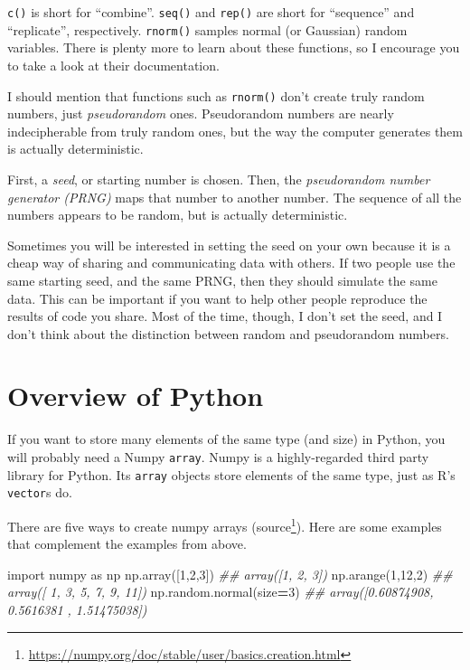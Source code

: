 \documentclass[
  12pt,
  krantz2]{krantz}
\makeatletter
\newenvironment{Shaded}{\begin{snugshade}}{\end{snugshade}}
\newcommand{\CommentTok}[1]{\textcolor[rgb]{0.37,0.37,0.37}{\textit{#1}}}
\newcommand{\DecValTok}[1]{\textcolor[rgb]{0.06,0.06,0.06}{#1}}
\newcommand{\ImportTok}[1]{#1}
\newcommand{\NormalTok}[1]{#1}
\newcommand{\OperatorTok}[1]{\textcolor[rgb]{0.43,0.43,0.43}{\textbf{#1}}}
\renewcommand{\href}[2]{#2\footnote{\url{#1}}}
\newenvironment{kframe}{%
\medskip{}
\setlength{\fboxsep}{.8em}
 \def\at@end@of@kframe{}%
 \ifinner\ifhmode%
  \def\at@end@of@kframe{\end{minipage}}%
  \begin{minipage}{\columnwidth}%
 \fi\fi%
 \def\FrameCommand##1{\hskip\@totalleftmargin \hskip-\fboxsep
 \colorbox{shadecolor}{##1}\hskip-\fboxsep
     \hskip-\linewidth \hskip-\@totalleftmargin \hskip\columnwidth}%
 \MakeFramed {\advance\hsize-\width
   \@totalleftmargin\z@ \linewidth\hsize
   \@setminipage}}%
 {\par\unskip\endMakeFramed%
 \at@end@of@kframe}
\renewenvironment{Shaded}{\begin{kframe}}{\end{kframe}}
\makeatother
\begin{document}
\texttt{c()} is short for ``combine''. \texttt{seq()} and \texttt{rep()} are short for ``sequence'' and ``replicate'', respectively. \texttt{rnorm()} samples normal (or Gaussian) random variables. There is plenty more to learn about these functions, so I encourage you to take a look at their documentation.

\begin{rmd-details}
I should mention that functions such as \texttt{rnorm()} don't create truly random numbers, just \emph{pseudorandom} ones. Pseudorandom numbers are nearly indecipherable from truly random ones, but the way the computer generates them is actually deterministic.

First, a \emph{seed}, or starting number is chosen. Then, the \emph{pseudorandom number generator (PRNG)} maps that number to another number. The sequence of all the numbers appears to be random, but is actually deterministic.

Sometimes you will be interested in setting the seed on your own because it is a cheap way of sharing and communicating data with others. If two people use the same starting seed, and the same PRNG, then they should simulate the same data. This can be important if you want to help other people reproduce the results of code you share. Most of the time, though, I don't set the seed, and I don't think about the distinction between random and pseudorandom numbers.

\end{rmd-details}

\hypertarget{overview-of-python}{%
\section{Overview of Python}\label{overview-of-python}}

If you want to store many elements of the same type (and size) in Python, you will probably need a Numpy \texttt{array}. Numpy is a highly-regarded third party library \citep{harris2020array} for Python. Its \texttt{array} objects store elements of the same type, just as R's \texttt{vector}s do.

There are five ways to create numpy arrays (\href{https://numpy.org/doc/stable/user/basics.creation.html}{source}). Here are some examples that complement the examples from above.

\begin{Shaded}
\begin{Highlighting}[]
\ImportTok{import}\NormalTok{ numpy }\ImportTok{as}\NormalTok{ np   }
\NormalTok{np.array([}\DecValTok{1}\NormalTok{,}\DecValTok{2}\NormalTok{,}\DecValTok{3}\NormalTok{])}
\CommentTok{\#\# array([1, 2, 3])}
\NormalTok{np.arange(}\DecValTok{1}\NormalTok{,}\DecValTok{12}\NormalTok{,}\DecValTok{2}\NormalTok{)}
\CommentTok{\#\# array([ 1,  3,  5,  7,  9, 11])}
\NormalTok{np.random.normal(size}\OperatorTok{=}\DecValTok{3}\NormalTok{)}
\CommentTok{\#\# array([0.60874908, 0.5616381 , 1.51475038])}
\end{Highlighting}
\end{Shaded}
\end{document}
